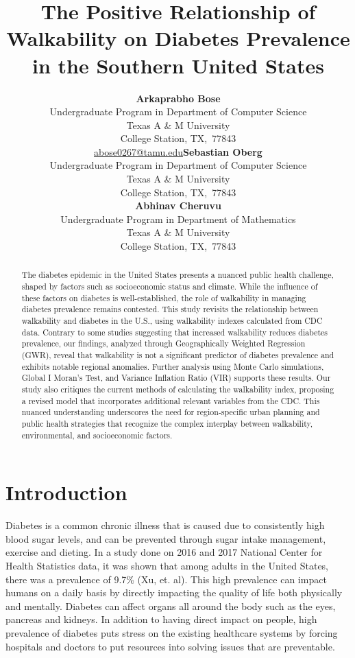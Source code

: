 \documentclass[
]{article}
\title{The Positive Relationship of Walkability on Diabetes Prevalence
in the Southern United States}
\author{\textbf{Arkaprabho Bose}\\Undergraduate Program in Department of
Computer Science\\Texas A \& M University\\College Station,
TX,\ 77843\\\href{mailto:abose0267@tamu.edu}{abose0267@tamu.edu}\asep\textbf{Sebastian
Oberg}\\Undergraduate Program in Department of Computer Science\\Texas A
\& M University\\College Station, TX,\ 77843\\\asep\textbf{Abhinav
Cheruvu}\\Undergraduate Program in Department of Mathematics\\Texas A \&
M University\\College Station, TX,\ 77843\\}
\date{}
\begin{document}
\maketitle
\begin{abstract}
The diabetes epidemic in the United States presents a nuanced public
health challenge, shaped by factors such as socioeconomic status and
climate. While the influence of these factors on diabetes is
well-established, the role of walkability in managing diabetes
prevalence remains contested. This study revisits the relationship
between walkability and diabetes in the U.S., using walkability indexes
calculated from CDC data. Contrary to some studies suggesting that
increased walkability reduces diabetes prevalence, our findings,
analyzed through Geographically Weighted Regression (GWR), reveal that
walkability is not a significant predictor of diabetes prevalence and
exhibits notable regional anomalies. Further analysis using Monte Carlo
simulations, Global I Moran's Test, and Variance Inflation Ratio (VIR)
supports these results. Our study also critiques the current methods of
calculating the walkability index, proposing a revised model that
incorporates additional relevant variables from the CDC. This nuanced
understanding underscores the need for region-specific urban planning
and public health strategies that recognize the complex interplay
between walkability, environmental, and socioeconomic factors.
\end{abstract}

\section{Introduction}\label{sec-intro}

Diabetes is a common chronic illness that is caused due to consistently
high blood sugar levels, and can be prevented through sugar intake
management, exercise and dieting. In a study done on 2016 and 2017
National Center for Health Statistics data, it was shown that among
adults in the United States, there was a prevalence of 9.7\% (Xu, et.
al). This high prevalence can impact humans on a daily basis by directly
impacting the quality of life both physically and mentally. Diabetes can
affect organs all around the body such as the eyes, pancreas and
kidneys. In addition to having direct impact on people, high prevalence
of diabetes puts stress on the existing healthcare systems by forcing
hospitals and doctors to put resources into solving issues that are
preventable.
\end{document}
